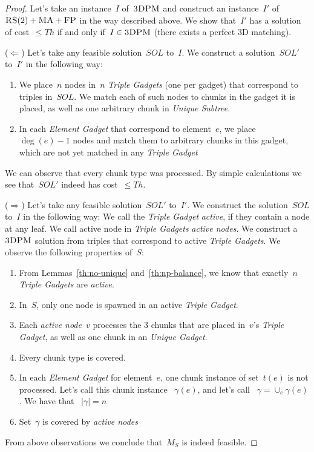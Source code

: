 \documentclass[preprint,12pt]{elsarticle}
\newcommand{\FP}{\textsc{FP}}
\newcommand{\RS}{\textsc{RS}}
\newcommand{\MA}{\textsc{MA}}
\newcommand{\TDPM}{\textsc{3DPM}}
\newcommand{\Unmatched}{\gamma}
\newcommand{\ActiveNode}{\textit{active node}}
\newcommand{\ActiveNodes}{\textit{active nodes}}
\newcommand{\Solution}{S}
\newcommand{\UnqSubtree}{{{\emph{Unique Subtree}}}}
\newcommand{\TripleGadget}{{\emph{Triple Gadget}}}
\newcommand{\TripleGadgets}{{\emph{Triple Gadgets}}}
\newcommand{\UnqGadget}{{\emph{Unique Gadget}}}
\newcommand{\ElGadget}{{\emph{Element Gadget}}}
\newcommand{\Thr}{\ensuremath{Th}}
\newcommand{\Sol}{\ensuremath{SOL}}
\begin{document}
\begin{proof}
  
  Let's take an instance~$I$ of~$\TDPM$ and construct an instance~$I'$
  of~$\RS(2)+\MA+\FP$ in the way described above.  We show that~$I'$
  has a solution of cost~$\leq \Thr$ if and only if~$I \in \TDPM$ (there
  exists a perfect 3D matching).

  ($\Leftarrow$) Let's take any feasible solution~$\Sol$ to~$I$. We
  construct a solution~$\Sol'$ to~$I'$ in the following way:
  \begin{enumerate}
    \item We place~$n$ nodes in~$n$ {\TripleGadgets} (one per gadget)
    that correspond to triples in~$\Sol$. We match each of such nodes
    to chunks in the gadget it is placed, as well as one arbitrary
    chunk in {\UnqSubtree}.
    \item In each {\ElGadget} that correspond to element~$e$, we place
   ~$\deg(e) - 1$ nodes and match them to arbitrary chunks in this
    gadget, which are not yet matched in any {\TripleGadget}
  \end{enumerate}

  We can observe that every chunk type was processed. By simple
  calculations we see that~$\Sol'$ indeed has cost~$\leq \Thr$.

  ($\Rightarrow$) Let's take any feasible solution~$\Sol'$ to~$I'$.
  We construct the solution~$\Sol$ to~$I$ in the following way:
  We call the {\TripleGadget} \textit{active}, if they contain a node
  at any leaf. We call active node in
  {\TripleGadgets} \ActiveNodes. We construct a~$\TDPM$ solution from
  triples that correspond to active \TripleGadgets.
  We observe the following properties of~$\Solution$:
  \begin{enumerate}
    \item From Lemmas~\ref{th:no-unique} and~\ref{th:np-balance}, we
    know that exactly~$n$ {\TripleGadgets} are \emph{active}.
    \item In~$\Solution$, only one node is spawned in an active
    \TripleGadget.
    \item Each {\ActiveNode}~$v$ processes the 3 chunks that are
    placed in~$v$'s \TripleGadget, as well as one chunk in an \UnqGadget.
    \item Every chunk type is covered.
    \item In each {\ElGadget} for element~$e$, one chunk instance of
    set~$t(e)$ is not processed. Let's call this chunk instance
   ~$\Unmatched(e)$, and let's call
   ~$\Unmatched = \cup_e \Unmatched(e)$. We have that
   ~$|\Unmatched| = n$
    \item Set~$\Unmatched$ is covered by \ActiveNodes
  \end{enumerate}

  From above observations we conclude that~$M_S$ is indeed feasible.
\end{proof}
\end{document}
